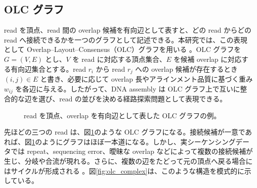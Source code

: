 \documentclass[a4j,10pt]{ujarticle}
\begin{document}
\subsection{OLC グラフ}

read を頂点、read 間の overlap 候補を有向辺として表すと、どの read からどの read へ接続できるかを一つのグラフとして記述できる。本研究では、この表現として Overlap--Layout--Consensus（OLC）グラフを用いる \cite{kececioglu1995assembly,myers2005string}。OLC グラフを $G=(V,E)$ とし、$V$ を read に対応する頂点集合、$E$ を候補 overlap に対応する有向辺集合とする。read $r_i$ から read $r_j$ への overlap 候補が存在するとき $(i,j)\in E$ と書き、必要に応じて overlap 長やアラインメント品質に基づく重み $w_{ij}$ を各辺に与える。したがって、DNA assembly は OLC グラフ上で互いに整合的な辺を選び、read の並びを決める経路探索問題として表現できる。




\begin{figure}[tbp]
\centering
{}

\caption{
read を頂点、overlap を有向辺として表した OLC グラフの例。
}
\label{fig:olc_simple}
\end{figure}

先ほどの三つの read は、図\ref{fig:olc_simple}のような OLC グラフになる。接続候補が一意であれば、図\ref{fig:olc_simple}のようにグラフはほぼ一本道になる。しかし、実シーケンシングデータでは repeat、sequencing error、曖昧な overlap などによって複数の接続候補が生じ、分岐や合流が現れる。さらに、複数の辺をたどって元の頂点へ戻る場合にはサイクルが形成される \cite{li2016miniasm,kamath2017hinge,kolmogorov2019flye}。図\ref{fig:olc_complex}は、このような構造を模式的に示している。

\end{document}

